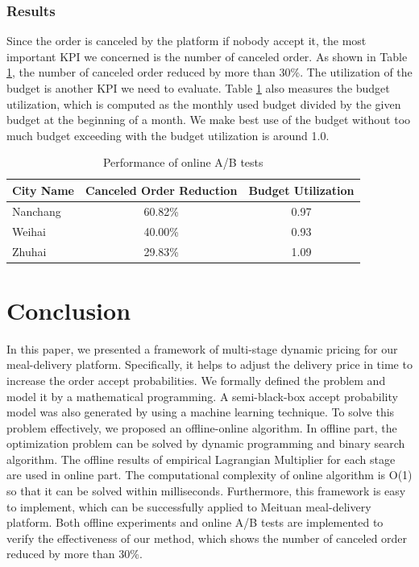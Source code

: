\documentclass[sigconf,authordraft]{acmart}
\begin{document}
\subsubsection{Results}
Since the order is canceled by the platform if nobody accept it, the most important KPI we concerned is the number of canceled order. As shown in Table \ref{tab:abtest}, the number of canceled order reduced by more than 30\%. The utilization of the budget is another KPI we need to evaluate. Table \ref{tab:abtest} also measures the budget utilization, which is computed as the monthly used budget divided by the given budget at the beginning of a month.  We make best use of the budget without too much budget exceeding with the budget utilization is around 1.0. 


\begin{table}[t]
\caption{Performance of online A/B tests}
\label{tab:abtest}
\begin{tabular}{l|cc}
\toprule
City Name & Canceled Order Reduction & Budget Utilization   \\
\midrule
Nanchang  & 60.82\%             & 0.97 \\
Weihai    & 40.00\%                      &0.93 \\
Zhuhai    & 29.83\%             &1.09\\
\bottomrule
\end{tabular}

\end{table}

\section{Conclusion}\label{sec:conc}
In this paper, we presented a framework of multi-stage dynamic pricing for our meal-delivery platform. Specifically, it helps to adjust the delivery price in time to increase the order accept probabilities. We formally defined the problem and model it by a mathematical programming. A semi-black-box accept probability model was also generated by using a machine learning technique. To solve this problem effectively, we proposed an offline-online algorithm. In offline part, the optimization problem can be solved by dynamic programming and binary search algorithm. The offline results of empirical Lagrangian Multiplier for each stage are used in online part. The computational complexity of online algorithm is O(1) so that it can be solved within milliseconds. Furthermore, this framework is easy to implement, which can be successfully applied to Meituan meal-delivery platform. Both offline experiments and online A/B tests are implemented to verify the effectiveness of our method, which shows the number of canceled order reduced by more than 30\%.
\end{document}
